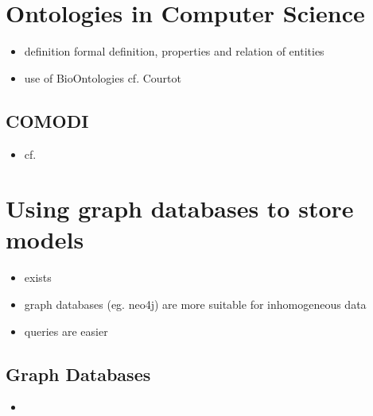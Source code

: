 \section{Ontologies in Computer Science}

	\begin{itemize}
	\item definition
		\subitem formal definition, properties and relation of entities
	\item use of BioOntologies cf. Courtot
	\end{itemize}

	
	\subsection{COMODI}
	\begin{itemize}
		\item cf. \cite{Scharm2016}
	\end{itemize}
	
\section{Using graph databases to store \sysbio models}
	\begin{itemize}
		\item \masymos exists
		\item graph databases (eg. neo4j) are more suitable for inhomogeneous data
		\item queries are easier
	\end{itemize}
	
	\subsection{Graph Databases}
	\begin{itemize}
		\item {}
	\end{itemize}
	
